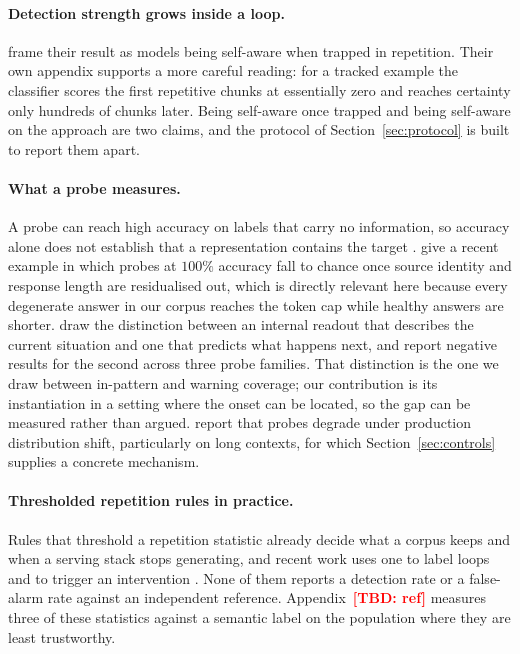 \documentclass{article}
\newcommand{\TBD}[1]{\textcolor{red}{\textbf{[TBD: #1]}}}
\begin{document}
\paragraph{Detection strength grows inside a loop.}
\citet{xie2025wordsalad} frame their result as models being self-aware when
trapped in repetition. Their own appendix supports a more careful reading: for a
tracked example the classifier scores the first repetitive chunks at essentially
zero and reaches certainty only hundreds of chunks later. Being self-aware once
trapped and being self-aware on the approach are two claims, and the protocol of
Section~\ref{sec:protocol} is built to report them apart.

\paragraph{What a probe measures.}
A probe can reach high accuracy on labels that carry no information, so accuracy
alone does not establish that a representation contains the target
\citep{hewitt2019designing}. \citet{sahoo2026linear} give a recent example in
which probes at $100\%$ accuracy fall to chance once source identity and
response length are residualised out, which is directly relevant here because
every degenerate answer in our corpus reaches the token cap while healthy answers
are shorter. \citet{fomin2026internal} draw the distinction between an internal
readout that describes the current situation and one that predicts what happens
next, and report negative results for the second across three probe families.
That distinction is the one we draw between in-pattern and warning coverage; our
contribution is its instantiation in a setting where the onset can be located, so
the gap can be measured rather than argued. \citet{kramar2026building} report
that probes degrade under production distribution shift, particularly on long
contexts, for which Section~\ref{sec:controls} supplies a concrete mechanism.

\paragraph{Thresholded repetition rules in practice.}
Rules that threshold a repetition statistic already decide what a corpus keeps
\citep{rae2021scaling} and when a serving stack stops generating, and recent work
uses one to label loops and to trigger an intervention \citep{xu2026loopguard}.
None of them reports a detection rate or a false-alarm rate against an
independent reference. Appendix~\TBD{ref} measures three of these statistics
against a semantic label on the population where they are least trustworthy.
\end{document}
